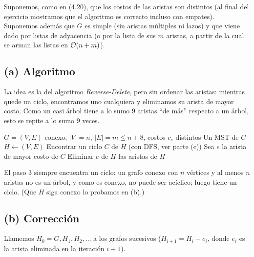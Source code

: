 Suponemos, como en (4.20), que los costos de las aristas son distintos (al final del ejercicio mostramos que el algoritmo es correcto incluso con empates). Suponemos además que $G$ es simple (sin aristas múltiples ni lazos) y que viene dado por listas de adyacencia (o por la lista de sus $m$ aristas, a partir de la cual se arman las listas en $\mathcal{O}(n+m)$).

\subsection*{(a) Algoritmo}

La idea es la del algoritmo \emph{Reverse-Delete}, pero sin ordenar las aristas: mientras quede un ciclo, encontramos uno cualquiera y eliminamos su arista de mayor costo. Como un casi árbol tiene a lo sumo $9$ aristas ``de más'' respecto a un árbol, esto se repite a lo sumo $9$ veces.

\begin{algorithm}[H]
\caption{MST de un casi árbol}
\begin{algorithmic}[1]
\Require $G=(V,E)$ conexo, $|V|=n$, $|E|=m\le n+8$, costos $c_e$ distintos
\Ensure Un MST de $G$
\State $H \gets (V,E)$ 
  \State Encontrar un ciclo $C$ de $H$ (con DFS, ver parte (c))
  \State Sea $e$ la arista de mayor costo de $C$
  \State Eliminar $e$ de $H$
\EndWhile
\State \Return las aristas de $H$
\end{algorithmic}
\end{algorithm}

El paso 3 siempre encuentra un ciclo: un grafo conexo con $n$ vértices y al menos $n$ aristas no es un árbol, y como es conexo, no puede ser acíclico; luego tiene un ciclo. (Que $H$ siga conexo lo probamos en (b).)

\subsection*{(b) Corrección}

Llamemos $H_0=G, H_1, H_2,\dots$ a los grafos sucesivos ($H_{i+1}=H_i-e_i$, donde $e_i$ es la arista eliminada en la iteración $i+1$).

